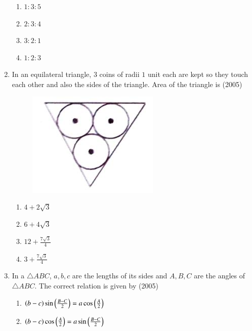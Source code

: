 \begin{enumerate}[label=\thesubsection.\arabic*,ref=\thesubsection.\theenumi]
\begin{multicols}{2}
\begin{enumerate}
\item $1\colon3\colon5$
\item $2\colon3\colon4$
\item $3\colon2\colon1$
\item $1\colon2\colon3$
\end{enumerate}
\end{multicols}
%
\item In an equilateral triangle, $3$ coins of radii $1$ unit each are kept so they touch each other and also the sides of the triangle. Area of the triangle is 
\hfill (2005)
\begin{figure}[htp]
    \centering
    \includegraphics[width=0.75\columnwidth]{figs/figure.png}
    \label{fig:figure}
\end{figure}
\begin{multicols}{4}
\begin{enumerate}
\item $4+2\sqrt{3}$
\item $6+4\sqrt{3}$
\item $12+\frac{7\sqrt{3}}{4}$
\item $3+\frac{7\sqrt{3}}{4}$
\end{enumerate}
\end{multicols}
%
\item In a $\triangle ABC$, $a, b, c$  are the lengths of its sides and $A, B, C$ are the angles of $\triangle ABC$. The correct relation is given by
\hfill (2005)
\begin{multicols}{2}
\begin{enumerate}
\item $\left(b-c\right) \sin \left(\frac{B-C}{2}\right) = a \cos \left(\frac{A}{2}\right)$
\item $\left(b-c\right) \cos \left(\frac{A}{2}\right) = a \sin \left(\frac{B-C}{2}\right)$

\end{enumerate}
\end{multicols}
\end{enumerate}
